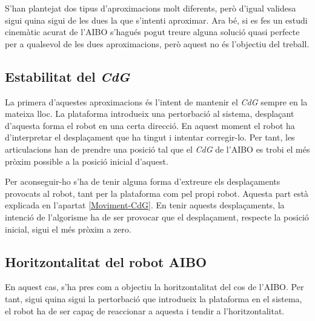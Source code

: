 \documentclass[12pt,a4paper,final,twoside]{report}
\begin{document}
S'han plantejat dos tipus d'aproximacions molt diferents, però d'igual validesa sigui quina sigui de les dues la que s'intenti aproximar. Ara bé, si es fes un estudi cinemàtic acurat de l'AIBO s'hagués pogut treure alguna solució quasi perfecte per a qualsevol de les dues aproximacions, però aquest no és l'objectiu del treball.

\subsection{Estabilitat del \textit{CdG}}

La primera d'aquestes aproximacions és l'intent de mantenir el \textit{CdG} sempre en la mateixa lloc. La plataforma introdueix una pertorbació al sistema, desplaçant d'aquesta forma el robot en una certa direcció. En aquest moment el robot ha d'interpretar el desplaçament que ha tingut i intentar corregir-lo. Per tant, les articulacions han de prendre una posició tal que el \textit{CdG} de l'AIBO es trobi el més pròxim possible a la posició inicial d'aquest.

Per aconseguir-ho s'ha de tenir alguna forma d'extreure els desplaçaments provocats al robot, tant per la plataforma com pel propi robot. Aquesta part està explicada en l'apartat \ref{Moviment-CdG}. En tenir aquests desplaçaments, la intenció de l'algorisme ha de ser provocar que el desplaçament, respecte la posició inicial, sigui el més pròxim a zero.

\subsection{Horitzontalitat del robot AIBO}
\label{Horitzontal-robot}

En aquest cas, s'ha pres com a objectiu la horitzontalitat del cos de l'AIBO. Per tant, sigui quina sigui la pertorbació que introdueix la plataforma en el sistema, el robot ha de ser capaç de reaccionar a aquesta i tendir a l'horitzontalitat.





\end{document}
